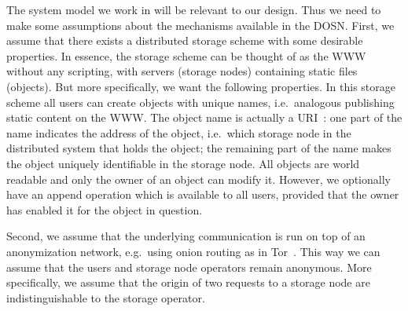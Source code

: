 The system model we work in will be relevant to our design.
Thus we need to make some assumptions about the mechanisms available in the 
\ac{DOSN}.
First, we assume that there exists a distributed storage scheme with some 
desirable properties.
In essence, the storage scheme can be thought of as the \ac{WWW} without any 
scripting, with servers (storage nodes) containing static files (objects).
But more specifically, we want the following properties.
In this storage scheme all users can create objects with unique names, i.e.\ 
analogous publishing static content on the \ac{WWW}.
The object name is actually a \ac{URI}~\cite{rfc3986}:
one part of the name indicates the address of the object, i.e.\ which storage 
node in the distributed system that holds the object;
the remaining part of the name makes the object uniquely identifiable in the 
storage node.
All objects are world readable and only the owner of an object can modify it.
However, we optionally have an append operation which is available to all 
users, provided that the owner has enabled it for the object in question.


Second, we assume that the underlying communication is run on top of an 
anonymization network, e.g.\ using onion routing as in Tor~\cite{Tor}.
This way we can assume that the users and storage node operators remain 
anonymous.
More specifically, we assume that the origin of two requests to a storage node 
are indistinguishable to the storage operator.


